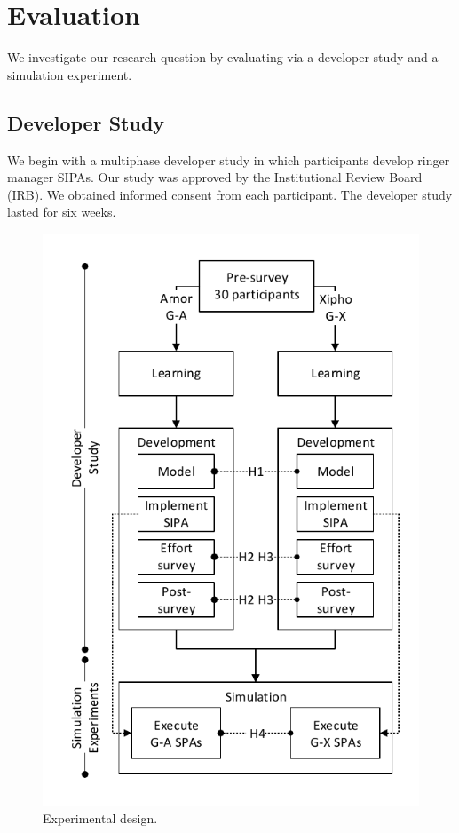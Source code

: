 \section{Evaluation}
\label{sec:arnor-experiments}

We investigate our research question by evaluating \frameworkA via a
developer study and a simulation experiment.


\subsection{Developer Study}
\label{sec:devstudy}

We begin with a multiphase developer study in
which participants develop ringer manager SIPAs. Our study was approved
by the Institutional Review Board (IRB). We obtained informed consent
from each participant. The developer study lasted for six weeks.

\begin{figure}[!htb] \centering
\includegraphics[angle=0,width={0.60\columnwidth}]{Chapter-3/fig/design}
\caption[Experimental design]{Experimental design.}
\label{fig:design} \end{figure}

